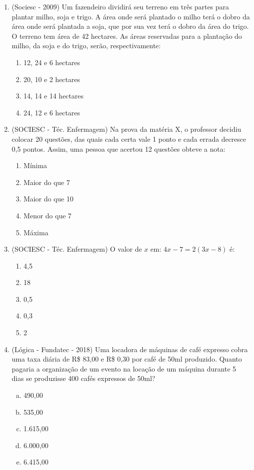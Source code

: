 \begin{enumerate}
\begin{multicols}{2}
 \texttt{[image: ../../Topicos/Figuras/dist\_exer1.pdf]} 
 
 \end{multicols}
 
 \item (Sociesc - 2009) Um fazendeiro dividirá seu terreno em três partes para plantar milho, soja e trigo. A área onde será plantado o milho terá o dobro da área onde será plantada a soja, que por sua vez terá o dobro da área do trigo. O terreno tem área de 42 hectares. As áreas reservadas para a plantação do milho, da soja e do trigo, serão, respectivamente:
  \begin{enumerate}
  \item 12, 24 e 6 hectares
  \item 20, 10 e 2 hectares
  \item 14, 14 e 14 hectares
  \item 24, 12 e 6 hectares
 \end{enumerate}
 
 \item (SOCIESC - Téc. Enfermagem) Na prova da matéria X, o professor decidiu colocar 20 questões, das quais cada certa vale 1 ponto e cada errada decresce 0,5 pontos. Assim, uma pessoa que acertou 12 questões obteve a nota:
  \begin{enumerate}
  \item Mínima
  \item Maior do que 7
  \item Maior do que 10
  \item Menor do que 7
  \item Máxima
 \end{enumerate}
 
 \item (SOCIESC - Téc. Enfermagem) O valor de $x$ em: $4x-7=2(3x-8)$ é:
 \begin{enumerate}
  \item 4,5
  \item 18
  \item 0,5
  \item 0,3
  \item 2
 \end{enumerate}
 
 \item (Lógica - Fundatec - 2018) Uma locadora de máquinas de café expresso cobra uma taxa diária de R\$ 83,00 e R\$ 0,30 por café de 50ml produzido. Quanto pagaria a organização de um evento na locação de um máquina durante 5 dias se produzisse 400 cafés expressos de 50ml?
\begin{multicols}{2}
\begin{enumerate}[a)]
\item 490,00
\item 535,00
\item 1.615,00
\item 6.000,00
\item 6.415,00
\end{enumerate}
\end{multicols}


\end{enumerate}
